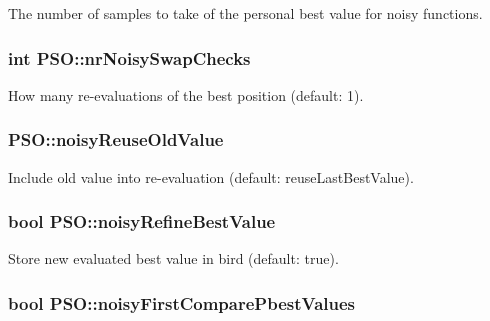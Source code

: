 The number of samples to take of the personal best value for noisy functions. 

\hypertarget{classPSO_d55215fbf697c2c494f1543df2164d24}{
\subsubsection{\setlength{\rightskip}{0pt plus 5cm}int {\bf PSO::nrNoisySwapChecks}}}
\label{classPSO_d55215fbf697c2c494f1543df2164d24}


How many re-evaluations of the best position (default: 1). 

\hypertarget{classPSO_05c0da62c3b5e480a1b26762e3309c21}{
\subsubsection{ {\bf PSO::noisyReuseOldValue}}}
\label{classPSO_05c0da62c3b5e480a1b26762e3309c21}


Include old value into re-evaluation (default: reuseLastBestValue). 

\hypertarget{classPSO_b222b8aeb41451da1382476a1d81515b}{
\subsubsection{\setlength{\rightskip}{0pt plus 5cm}bool {\bf PSO::noisyRefineBestValue}}}
\label{classPSO_b222b8aeb41451da1382476a1d81515b}


Store new evaluated best value in bird (default: true). 

\hypertarget{classPSO_a568380cf709fb920e19d510b606db9f}{
\subsubsection{\setlength{\rightskip}{0pt plus 5cm}bool {\bf PSO::noisyFirstComparePbestValues}}}
\label{classPSO_a568380cf709fb920e19d510b606db9f}


